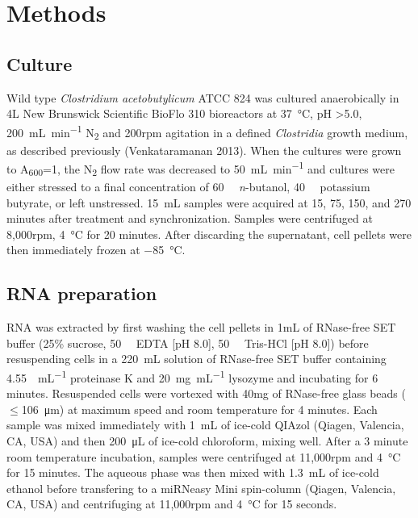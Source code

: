 
\chapter{Methods}


\section{Culture}
Wild type \textit{Clostridium acetobutylicum} ATCC 824 was cultured anaerobically in 4L New Brunswick Scientific BioFlo 310 bioreactors at \SI{37}{\degreeCelsius}, pH >5.0, \SI{200}{\milli\liter\per\minute} N\textsubscript{2} and 200rpm agitation in a defined \textit{Clostridia} growth medium, as described previously (Venkataramanan 2013). When the cultures were grown to A\textsubscript{600}=1, the N\textsubscript{2} flow rate was decreased to \SI{50}{\milli\liter\per\minute} and cultures were either stressed to a final concentration of \SI{60}{\milli\Molar} \textit{n}-butanol, \SI{40}{\milli\Molar} potassium butyrate, or left unstressed. \SI{15}{\milli\liter} samples were acquired at 15, 75, 150, and 270 minutes after treatment and synchronization. Samples were centrifuged at 8,000rpm, \SI{4}{\degreeCelsius} for 20 minutes. After discarding the supernatant, cell pellets were then immediately frozen at \SI{-85}{\degreeCelsius}.

\section{RNA preparation}
RNA was extracted by first washing the cell pellets in 1mL of RNase-free SET buffer (25\% sucrose, \SI{50}{\milli\Molar} EDTA [pH 8.0], \SI{50}{\milli\Molar} Tris-HCl [pH 8.0]) before resuspending cells in a \SI{220}{\milli\liter} solution of RNase-free SET buffer containing \SI{4.55}{\Units\per\milli\liter} proteinase K and \SI{20}{\milli\gram\per\milli\liter} lysozyme and incubating for 6 minutes. Resuspended cells were vortexed with 40mg of RNase-free glass beads ($\leq$\SI{106}{\micro\metre}) at maximum speed and room temperature for 4 minutes. Each sample was mixed immediately with \SI{1}{\milli\liter} of ice-cold QIAzol (Qiagen, Valencia, CA, USA) and then \SI{200}{\micro\liter} of ice-cold chloroform, mixing well. After a 3 minute room temperature incubation, samples were centrifuged at 11,000rpm and \SI{4}{\degreeCelsius} for 15 minutes. The aqueous phase was then mixed with \SI{1.3}{\milli\liter} of ice-cold ethanol before transfering to a miRNeasy Mini spin-column (Qiagen, Valencia, CA, USA) and centrifuging at 11,000rpm and \SI{4}{\degreeCelsius} for 15 seconds.

